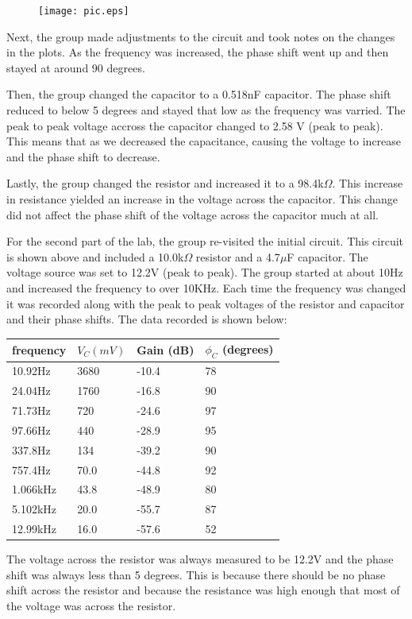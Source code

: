 \documentclass[twocolumn, amsmath]{revtex4}
\begin{document}
\begin{figure}[h]  

\texttt{[image: pic.eps]}  
\end{figure}

Next, the group made adjustments to the circuit and took notes on the changes in the plots. As the frequency was increased, the phase shift went up and then stayed at around 90 degrees. 

Then, the group changed the capacitor to a 0.518nF capacitor. The phase shift reduced to below 5 degrees and stayed that low as the frequency was varried. The peak to peak voltage accross the capacitor changed to 2.58 V (peak to peak). This means that as we decreased the capacitance, causing the voltage to increase and the phase shift to decrease.

Lastly, the group changed the resistor and increased it to a 98.4k$\Omega$. This increase in resistance yielded an increase in the voltage across the capacitor. This change did not affect the phase shift of the voltage across the capacitor much at all.

For the second part of the lab, the group re-visited the initial circuit. This circuit is shown above and included a 10.0k$\Omega$ resistor and a 4.7$\mu$F capacitor. The voltage source was set to 12.2V (peak to peak). The group started at about 10Hz and increased the frequency to over 10KHz. Each time the frequency was changed it was recorded along with the peak to peak voltages of the resistor and capacitor and their phase shifts. The data recorded is shown below:

\begin{center}
    \begin{tabular}{| l | l | l | l |}
    \hline
    frequency & $V_C (mV)$  & Gain (dB) & $\phi _C$ (degrees)  \\ \hline
 
    10.92Hz	& 3680	& -10.4	 & 78   \\ \hline
    24.04Hz 	& 1760	& -16.8	  & 90  \\ \hline
    71.73Hz   	& 720 	& -24.6	 & 97    \\ \hline
    97.66Hz   	& 440 	& -28.9	 & 95  \\ \hline
    337.8Hz    	& 134	& -39.2	 & 90 \\ \hline
    757.4Hz    	& 70.0	& -44.8	 & 92 \\ \hline
    1.066kHz   & 43.8	& -48.9	 & 80  \\ \hline
    5.102kHz  & 20.0	& -55.7	 & 87  \\ \hline
    12.99kHz   	& 16.0 & -57.6	 & 52   \\
    \hline
    \end{tabular}
\end{center}
The voltage across the resistor was always measured to be 12.2V and the phase shift was always less than 5 degrees. This is because there should be no phase shift across the resistor and because the resistance was high enough that most of the voltage was across the resistor. 
\end{document}
